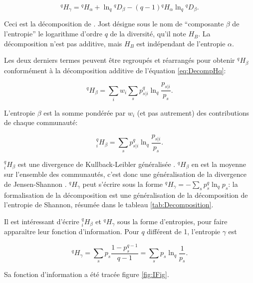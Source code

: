 \documentclass[
  11pt,
  french,
  a4paper,
  extrafontsizes,onecolumn,openright
  ]{memoir}
\begin{document}
\begin{equation}
  \label{eq:DecompJost}
  ^{q}\!H_{\gamma} = {^{q}\!H_{\alpha}}+\ln_q{^{q}\!D_{\beta}}-\left(q-1\right){^{q}\!H_{\alpha}}\ln_q{^{q}\!D_{\beta}}.
\end{equation}

Ceci est la décomposition de \textcite{Jost2007}.
Jost désigne sous le nom de ``composante \(\beta\) de l'entropie'' le logarithme d'ordre \(q\) de la diversité, qu'il note \(H_B\).
La décomposition n'est pas additive, mais \(H_B\) est indépendant de l'entropie \(\alpha\).

Les deux derniers termes peuvent être regroupés et réarrangés pour obtenir \(^{q}\!H_{\beta}\) conformément à la décomposition additive de l'équation \eqref{eq:DecompHq}:

\begin{equation}
  \label{eq:ContributionBeta}
  ^{q}\!H_{\beta} = \sum_i{w_i\sum_s{p^q_{s|i}\ln_q\frac{p_{s|i}}{p_s}}}.
\end{equation}

L'entropie \(\beta\) est la somme pondérée par \(w_i\) (et pas autrement) des contributions de chaque communauté:

\begin{equation}
  \label{eq:PoidsHbetai}
  ^{q}_{i}\!H_{\beta}=\sum_s{p^q_{s|i}\ln_q\frac{p_{s|i}}{p_s}}.
\end{equation}

\(^{q}_{i}\!H_{\beta}\) est une divergence de Kullback-Leibler généralisée \autocite{Borland1998,Tsallis1998}.
\(^{q}\!H_{\beta}\) en est la moyenne sur l'ensemble des communautés, c'est donc une généralisation de la divergence de Jensen-Shannon \autocite{Marcon2014a}.
\(^{q}\!H_{\gamma}\) peut s'écrire sous la forme \(^{q}\!H_{\gamma} = -\sum_s{p^q_s}\ln_q{p_s}\): la formalisation de la décomposition est une généralisation de la décomposition de l'entropie de Shannon, résumée dans le tableau \ref{tab:Decomposition}.

Il est intéressant d'écrire \(^{q}_{i}\!H_{\beta}\) et \(^{q}\!H_{\gamma}\) sous la forme d'entropies, pour faire apparaître leur fonction d'information.
Pour \(q\) différent de 1, l'entropie \(\gamma\) est

\begin{equation}
  \label{eq:Hqgamma}
  ^{q}\!H_{\gamma} 
  = \sum_s{p_s\frac{1-p^{q-1}_s}{q-1}}
  = \sum_s{p_s\ln_q\frac{1}{p_s}}.
\end{equation}

Sa fonction d'information a été tracée figure \ref{fig:IFig}.
\end{document}
